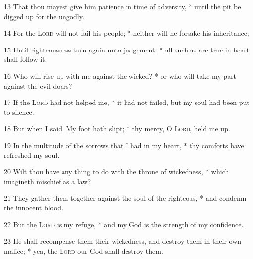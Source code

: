 13 That thou mayest give him patience in time of adversity, * until the pit be digged up for the ungodly.\par
14 For the {\textsc{Lord}} will not fail his people; * neither will he forsake his inheritance;\par
15 Until righteousness turn again unto judgement: * all such as are true in heart shall follow it.\par
16 Who will rise up with me against the wicked? * or who will take my part against the evil doers?\par
17 If the {\textsc{Lord}} had not helped me, * it had not failed, but my soul had been put to silence.\par
18 But when I said, My foot hath slipt; * thy mercy, O {\textsc{Lord}}, held me up.\par
19 In the multitude of the sorrows that I had in my heart, * thy comforts have refreshed my soul.\par
20 Wilt thou have any thing to do with the throne of wickedness, * which imagineth mischief as a law?\par
21 They gather them together against the soul of the righteous, * and condemn the innocent blood.\par
22 But the {\textsc{Lord}} is my refuge, * and my God is the strength of my confidence.\par
23 He shall recompense them their wickedness, and destroy them in their own malice; * yea, the {\textsc{Lord}} our God shall destroy them.
